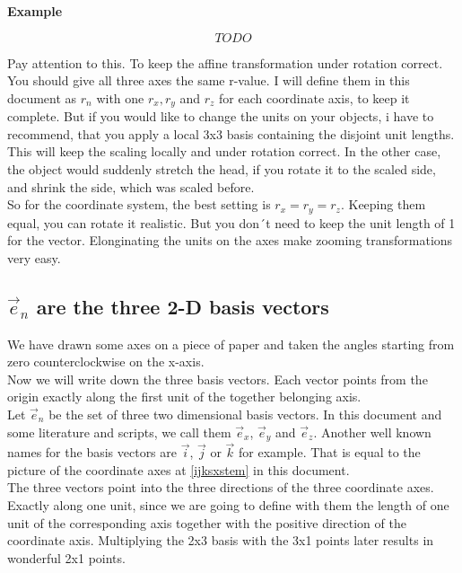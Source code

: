 \documentclass[a4paper]{article}
\begin{document}
\textbf{Example}
\begin{Example}
\begin{displaymath}
TODO
\end{displaymath}

Pay attention to this. To keep the affine transformation under rotation correct. You should give all three
axes the same r-value. I will define them in this document as $r_{n}$ with one $r_x, r_y$ and $r_z$ for each coordinate axis,
to keep it complete. But if you would like to change the units on your objects, i have to recommend, that you apply a local
3x3 basis containing the disjoint unit lengths. This will keep the scaling locally and under rotation correct.
In the other case, the object would suddenly stretch the head, if you rotate it to the scaled side, and shrink the side, 
which was scaled before.\\

So for the coordinate system, the best setting is $r_x = r_y = r_z$. Keeping them equal, you can rotate it realistic. But you
don´t need to keep the unit length of 1 for the vector. Elonginating the units on the axes make zooming transformations very
easy.\\

\subsection{$\vec{e}_{n}$ are the three 2-D basis vectors}

We have drawn some axes on a piece of paper and taken the angles starting from zero counterclockwise on the x-axis.\\

Now we will write down the three basis vectors. Each vector points from the origin exactly along the first unit of the together belonging axis.\\

Let $\vec{e}_{n}$ be the set of three two dimensional basis vectors. In this document and some literature and scripts,
we call them $\vec{e}_x$, $\vec{e}_y$ and $\vec{e}_z$. Another well known names for the basis vectors are $\vec{i}$, 
$\vec{j}$ or $\vec{k}$ for example. That is equal to the picture of the coordinate axes at \ref{ijksxstem} in this document.\\

The three vectors point into the three directions of the three coordinate axes. Exactly along one unit, since we are going
to define with them the length of one unit of the corresponding axis together with the positive direction of the coordinate axis.
Multiplying the 2x3 basis with the 3x1 points later results in wonderful 2x1 points. \\


\end{Example}
\end{document}
